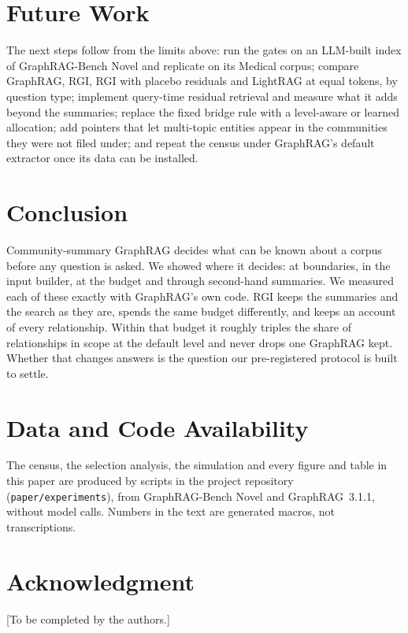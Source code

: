 \documentclass[journal]{IEEEtran}
\theoremstyle{remark}
\begin{document}
\section{Future Work}
The next steps follow from the limits above: run the gates on an LLM-built index of GraphRAG-Bench Novel and replicate on its Medical corpus; compare GraphRAG, RGI, RGI with placebo residuals and LightRAG at equal tokens, by question type; implement query-time residual retrieval and measure what it adds beyond the summaries; replace the fixed bridge rule with a level-aware or learned allocation; add pointers that let multi-topic entities appear in the communities they were not filed under; and repeat the census under GraphRAG's default extractor once its data can be installed.

\section{Conclusion}
Community-summary GraphRAG decides what can be known about a corpus before any question is asked. We showed where it decides: at boundaries, in the input builder, at the budget and through second-hand summaries. We measured each of these exactly with GraphRAG's own code. RGI keeps the summaries and the search as they are, spends the same budget differently, and keeps an account of every relationship. Within that budget it roughly triples the share of relationships in scope at the default level and never drops one GraphRAG kept. Whether that changes answers is the question our pre-registered protocol is built to settle.

\section*{Data and Code Availability}
The census, the selection analysis, the simulation and every figure and table in this paper are produced by scripts in the project repository (\texttt{paper/experiments}), from GraphRAG-Bench Novel and GraphRAG~3.1.1, without model calls. Numbers in the text are generated macros, not transcriptions.

\section*{Acknowledgment}
[To be completed by the authors.]




\raggedbottom %
\end{document}
